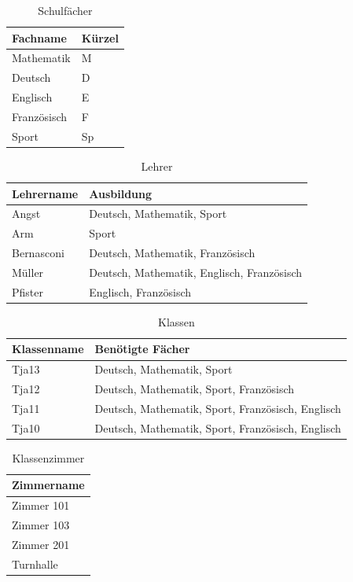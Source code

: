 \begin{table}[ht]
\centering
  \begin{tabular}{ l | l }
	\hline
	\rowcolor{gray}
	\textbf{Fachname}	& \textbf{Kürzel}\\ \hline
	Mathematik		& M\\ \hline
	Deutsch		& D\\ \hline
	Englisch		& E\\ \hline
	Französisch		& F\\ \hline
	Sport			& Sp
  \end{tabular}
   \caption{Schulfächer}\label{table:eg_subject}
\end{table}

\begin{table}[ht]
\centering
  \begin{tabular}{ l | l }
	\hline
	\rowcolor{gray}
	\textbf{Lehrername} 	& \textbf{Ausbildung}\\ \hline
	Angst				& Deutsch, Mathematik, Sport\\ \hline
	Arm				& Sport\\ \hline
	Bernasconi			& Deutsch, Mathematik, Französisch\\ \hline
	Müller				& Deutsch, Mathematik, Englisch, Französisch\\ \hline
	Pfister				& Englisch, Französisch
  \end{tabular}
   \caption{Lehrer}\label{table:eg_teacher}
\end{table}

\begin{table}[ht]
\centering
  \begin{tabular}{ l | l }
	\hline
	\rowcolor{gray}
	\textbf{Klassenname} 	& \textbf{Benötigte Fächer}\\ \hline
	Tja13				& Deutsch, Mathematik, Sport\\ \hline
	Tja12				& Deutsch, Mathematik, Sport, Französisch\\ \hline
	Tja11				& Deutsch, Mathematik, Sport, Französisch, Englisch\\ \hline
	Tja10				& Deutsch, Mathematik, Sport, Französisch, Englisch
  \end{tabular}
   \caption{Klassen}\label{table:eg_schoolclasses}
\end{table}

\begin{table}[ht]
\centering
  \begin{tabular}{ l }
	\hline
	\rowcolor{gray}
	\textbf{Zimmername}\\ \hline
	Zimmer 101\\ \hline
	Zimmer 103\\ \hline
	Zimmer 201\\ \hline
	Turnhalle
  \end{tabular}
   \caption{Klassenzimmer}\label{table:eg_schoolroom}
\end{table}

